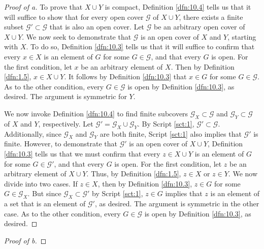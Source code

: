 \documentclass[../main.tex]{subfiles}
\begin{document}
\begin{enumerate}
\begin{proof}[Proof of a]
        To prove that $X\cup Y$ is compact, Definition \ref{dfn:10.4} tells us that it will suffice to show that for every open cover $\mathcal{G}$ of $X\cup Y$, there exists a finite subset $\mathcal{G}'\subset\mathcal{G}$ that is also an open cover. Let $\mathcal{G}$ be an arbitrary open cover of $X\cup Y$. We now seek to demonstrate that $\mathcal{G}$ is an open cover of $X$ and $Y$, starting with $X$. To do so, Definition \ref{dfn:10.3} tells us that it will suffice to confirm that every $x\in X$ is an element of $G$ for some $G\in\mathcal{G}$, and that every $G$ is open. For the first condition, let $x$ be an arbitrary element of $X$. Then by Definition \ref{dfn:1.5}, $x\in X\cup Y$. It follows by Definition \ref{dfn:10.3} that $x\in G$ for some $G\in\mathcal{G}$. As to the other condition, every $G\in\mathcal{G}$ is open by Definition \ref{dfn:10.3}, as desired. The argument is symmetric for $Y$.\par
        We now invoke Definition \ref{dfn:10.4} to find finite subcovers $\mathcal{G}_X\subset\mathcal{G}$ and $\mathcal{G}_Y\subset\mathcal{G}$ of $X$ and $Y$, respectively. Let $\mathcal{G}'=\mathcal{G}_X\cup\mathcal{G}_Y$. By Script \ref{sct:1}, $\mathcal{G}'\subset\mathcal{G}$. Additionally, since $\mathcal{G}_X$ and $\mathcal{G}_Y$ are both finite, Script \ref{sct:1} also implies that $\mathcal{G}'$ is finite. However, to demonstrate that $\mathcal{G}'$ is an open cover of $X\cup Y$, Definition \ref{dfn:10.3} tells us that we must confirm that every $z\in X\cup Y$ is an element of $G$ for some $G\in\mathcal{G}'$, and that every $G$ is open. For the first condition, let $z$ be an arbitrary element of $X\cup Y$. Thus, by Definition \ref{dfn:1.5}, $z\in X$ or $z\in Y$. We now divide into two cases. If $z\in X$, then by Definition \ref{dfn:10.3}, $z\in G$ for some $G\in\mathcal{G}_X$. But since $\mathcal{G}_X\subset\mathcal{G}'$ by Script \ref{sct:1}, $z\in G$ implies that $z$ is an element of a set that is an element of $\mathcal{G}'$, as desired. The argument is symmetric in the other case. As to the other condition, every $G\in\mathcal{G}$ is open by Definition \ref{dfn:10.3}, as desired.
    \end{proof}
    \begin{proof}[Proof of b]

\end{proof}
\end{enumerate}
\end{document}
